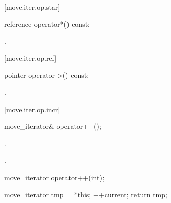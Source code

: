 [move.iter.op.star]{}

%
%
\begin{itemdecl}
reference operator*() const;
\end{itemdecl}

\begin{itemdescr}
\pnum
\removed{\returns}
.
\end{itemdescr}

\begin{removedblock}
{\color{oldclr}
[move.iter.op.ref]{}

%
%
\begin{itemdecl}
pointer operator->() const;
\end{itemdecl}

\begin{itemdescr}
\pnum
\returns {}.
\end{itemdescr}
} %
\end{removedblock}

[move.iter.op.incr]{}

%
%
\begin{itemdecl}
move_iterator& operator++();
\end{itemdecl}

\begin{itemdescr}
\pnum
\effects {} .

\pnum
\returns {}.
\end{itemdescr}

%
%
\begin{itemdecl}
move_iterator operator++(int);
\end{itemdecl}

\begin{itemdescr}
\pnum
\effects {}
\begin{codeblock}
move_iterator tmp = *this;
++current;
return tmp;
\end{codeblock}
\end{itemdescr}

